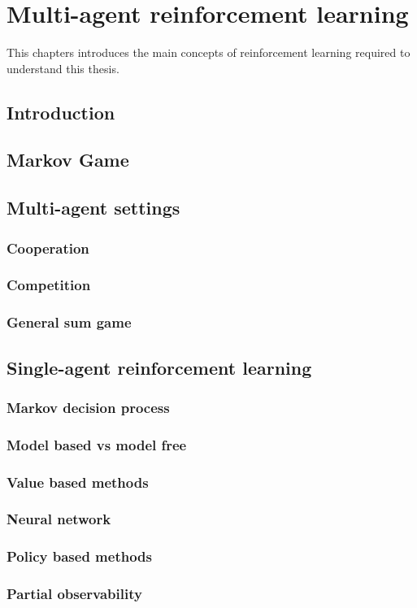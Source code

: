 \chapter{Multi-agent reinforcement learning}\label{ch:marl}

\begin{chapter_outline}

This chapters introduces the main concepts of reinforcement learning required to understand this thesis.

\end{chapter_outline}

\section{Introduction}
\section{Markov Game}
\section{Multi-agent settings}
\subsection{Cooperation}
\subsection{Competition}
\subsection{General sum game}
\section{Single-agent reinforcement learning}
\subsection{Markov decision process}
\subsection{Model based vs model free}
\subsection{Value based methods}
\subsection{Neural network}
\subsection{Policy based methods}
\subsection{Partial observability}